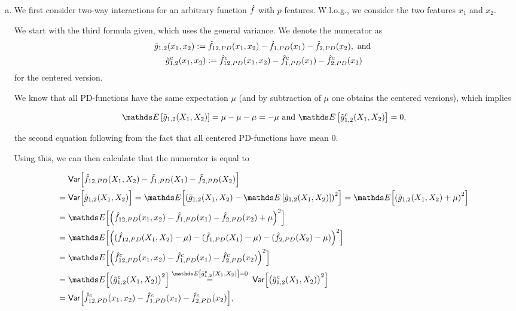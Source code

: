 {\begin{enumerate}[a)]
hence $H_{1,2} = \sqrt{ \tfrac{1}{26} } \approx 0.196$.

\item

We first consider two-way interactions for an arbitrary function $\hat{f}$ with $p$ features.
W.l.o.g., we consider the two features $x_1$ and $x_2$.

We start with the third formula given, which uses the general variance.
We denote the numerator as
\begin{gather*}
\tilde{g}_{1,2}(x_1, x_2) := \hat{f}_{12,PD}(x_1, x_2) -
    \hat{f}_{1,PD}(x_1) -
    \hat{f}_{2,PD}(x_2), \text{ and }\\
\tilde{g}^c_{1,2}(x_1, x_2) := \hat{f}^c_{12,PD}(x_1, x_2) -
    \hat{f}^c_{1,PD}(x_1) -
    \hat{f}^c_{2,PD}(x_2)
\end{gather*}
for the centered version.

We know that all PD-functions have the same expectation $\mu$ (and by subtraction of $\mu$ one obtains the centered versions), which implies

$$
\E \left[ \tilde{g}_{1,2}(X_1, X_2) \right] = \mu - \mu - \mu = - \mu \text{ and }
\E \left[ \tilde{g}^c_{1,2}(X_1, X_2) \right] = 0,
$$

the second equation following from the fact that all centered PD-functions have mean 0.

Using this, we can then calculate that the numerator is equal to

\begin{align*}
& \; \var \Bigl[
    \fh_{12,PD}(X_1, X_2)-
    \fh_{1,PD}(X_1)-
    \fh_{2,PD}(X_2)
    \Bigr] \\
= & \; \var \Bigl[ \tilde{g}_{1,2}(X_1, X_2) \Bigr] 
= \E \Bigl[ \left( \tilde{g}_{1,2}(X_1, X_2) - \E \left[ \tilde{g}_{1,2}(X_1, X_2) \right] \right)^2 \Bigr]
= \E \Bigl[ \left( \tilde{g}_{1,2}(X_1, X_2) + \mu \right)^2 \Bigr] \\
= & \; \E \Bigl[ \left( \fh_{12,PD}(x_1, x_2) -
    \fh_{1,PD}(x_1) -
    \fh_{2,PD}(x_2) + \mu \right)^2 \Bigr] \\
= & \; \E \Bigl[ \left( ( \fh_{12,PD}(X_1, X_2) - \mu)
    - ( \fh_{1,PD}(X_1) - \mu)
    - ( \fh_{2,PD}(X_2) - \mu) \right)^2 \Bigr] \\
= & \; \E \Bigl[ \left( \fh^c_{12,PD}(x_1, x_2) -
    \fh^c_{1,PD}(x_1) -
    \fh^c_{2,PD}(x_2) \right)^2 \Bigr] \\
= & \; \E \Bigl[ \left( \tilde{g}^c_{1,2}(X_1, X_2) \right)^2 \Bigr]
\overset{\E \left[ \tilde{g}^c_{1,2}(X_1, X_2) \right] = 0}{=}
\; \var \Bigl[ \left( \tilde{g}^c_{1,2}(X_1, X_2) \right)^2 \Bigr] \\
= & \; \var \Bigl[ \fh^c_{12,PD}(x_1, x_2) -
    \fh^c_{1,PD}(x_1) -
    \fh^c_{2,PD}(x_2) \Bigr],
\end{align*}


\end{enumerate}}
